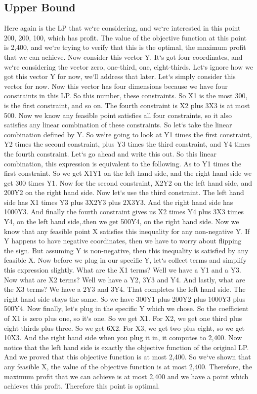 \subsection{Upper Bound}
Here again is the LP that we`re considering, and we`re interested in this point 200, 200, 100, which has profit.
The value of the objective function at this point is 2,400, and we`re trying to verify that this is the optimal, the maximum profit that we can achieve.
Now consider this vector Y\@.
It`s got four coordinates, and we`re considering the vector zero, one-third, one, eight-thirds.
Let`s ignore how we got this vector Y for now, we`ll address that later.
Let`s simply consider this vector for now.
Now this vector has four dimensions because we have four constraints in this LP\@.
So this number, these constraints.
So X1 is the most 300, is the first constraint, and so on.
The fourth constraint is X2 plus 3X3 is at most 500.
Now we know any feasible point satisfies all four constraints, so it also satisfies any linear combination of these constraints.
So let`s take the linear combination defined by Y\@.
So we`re going to look at Y1 times the first constraint, Y2 times the second constraint, plus Y3 times the third constraint, and Y4 times the fourth constraint.
Let`s go ahead and write this out.
So this linear combination, this expression is equivalent to the following.
As to Y1 times the first constraint.
So we get X1Y1 on the left hand side, and the right hand side we get 300 times Y1.
Now for the second constraint, X2Y2 on the left hand side, and 200Y2 on the right hand side.
Now let`s use the third constraint.
The left hand side has X1 times Y3 plus 3X2Y3 plus 2X3Y3.
And the right hand side has 1000Y3.
And finally the fourth constraint gives us X2 times Y4 plus 3X3 times Y4, on the left hand side,.then we get 500Y4, on the right hand side.
Now we know that any feasible point X satisfies this inequality for any non-negative Y\@.
If Y happens to have negative coordinates, then we have to worry about flipping the sign.
But assuming Y is non-negative, then this inequality is satisfied by any feasible X\@.
Now before we plug in our specific Y, let`s collect terms and simplify this expression slightly.
What are the X1 terms? Well we have a Y1 and a Y3.
Now what are X2 terms? Well we have a Y2, 3Y3 and Y4.
And lastly, what are the X3 terms? We have a 2Y3 and 3Y4.
That completes the left hand side.
The right hand side stays the same.
So we have 300Y1 plus 200Y2 plus 1000Y3 plus 500Y4.
Now finally, let`s plug in the specific Y which we chose.
So the coefficient of X1 is zero plus one, so it`s one.
So we get X1.
For X2, we get one third plus eight thirds plus three.
So we get 6X2.
For X3, we get two plus eight, so we get 10X3.
And the right hand side when you plug it in, it computes to 2,400.
Now notice that the left hand side is exactly the objective function of the original LP\@.
And we proved that this objective function is at most 2,400.
So we`ve shown that any feasible X, the value of the objective function is at most 2,400.
Therefore, the maximum profit that we can achieve is at most 2,400 and we have a point which achieves this profit.
Therefore this point is optimal.

